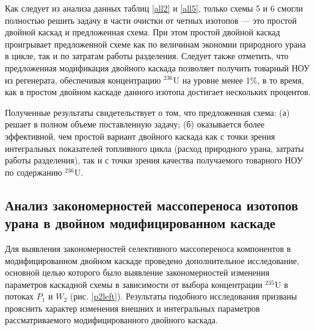 Как следует из анализа данных таблиц \ref{all2} и \ref{all5}, только схемы 5 и 6 смогли полностью решить задачу в части очистки от четных изотопов --- это простой двойной каскад и предложенная схема. При этом простой двойной каскад проигрывает предложенной схеме как по величинам экономии природного урана в цикле, так и по затратам работы разделения. Следует также отметить, что предложенная модификация двойного каскада позволяет получить товарный НОУ из регенерата, обеспечивая концентрацию $^{236}$U на уровне менее 1\%, в то время, как в простом двойном каскаде данного изотопа достигает нескольких процентов. 

Полученные результаты свидетельствует о том, что предложенная схема: (а) решает в полном объеме поставленную задачу; (б) оказывается более эффективной, чем простой вариант двойного каскада как с точки зрения интегральных показателей топливного цикла (расход природного урана, затраты работы разделения), так и с точки зрения качества получаемого товарного НОУ по содержанию $^{236}$U.

\subsection{Анализ закономерностей массопереноса изотопов урана в двойном модифицированном каскаде}

Для выявления закономерностей селективного массопереноса компонентов в модифицированном двойном каскаде  проведено дополнительное исследование, основной целью которого было выявление закономерностей изменения параметров каскадной схемы в зависимости от выбора концентрации $^{235}$U в потоках $P_1$ и $W_2$ (рис. \ref{p2left}). Результаты подобного исследования призваны прояснить характер изменения внешних и интегральных параметров рассматриваемого модифицированного двойного каскада.

